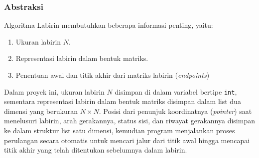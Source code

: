 \subsubsection{Abstraksi}
Algoritma Labirin membutuhkan beberapa informasi penting, yaitu:
\begin{enumerate}
    \item Ukuran labirin $N$.
    \item Representasi labirin dalam bentuk matriks.
    \item Penentuan awal dan titik akhir dari matriks labirin (\textit{endpoints})
\end{enumerate}
Dalam proyek ini, ukuran labirin $N$ disimpan di dalam variabel bertipe \lstinline|int|, sementara representasi labirin dalam bentuk matriks disimpan dalam list dua dimensi yang berukuran $N \times N$. Posisi dari penunjuk koordinatnya (\textit{pointer}) saat menelusuri labirin, arah gerakannya, status sisi, dan riwayat gerakannya disimpan ke dalam struktur list satu dimensi, kemudian program menjalankan proses perulangan secara otomatis untuk mencari jalur dari titik awal hingga mencapai titik akhir yang telah ditentukan sebelumnya dalam labirin.